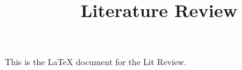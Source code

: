 \documentclass[11pt]{article}
\title{Literature Review}
\date{\vspace{-5ex}} %
\begin{document}
\maketitle
\onehalfspacing
This is the LaTeX document for the Lit Review. 
\end{document}
